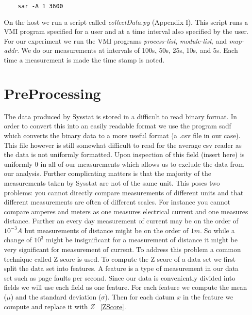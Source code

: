 \begin{center}\label{SAR}
\begin{verbatim}
	sar -A 1 3600
\end{verbatim}
\end{center}

On the host we run a script called \textit{collectData.py} (Appendix I). This script runs a VMI program specified for a user and at a time interval also specified by the user. For our experiment we run the VMI programs \textit{process-list}, \textit{module-list}, and \textit{map-addr}. We do our measurements at intervals of 100s, 50s, 25s, 10s, and 5s. Each time a measurement is made the time stamp is noted.

\section{PreProcessing}

The data produced by Sysstat is stored in a difficult to read binary format. In order to convert this into an easily readable format we use the program sadf~\cite{godard2010sysstat} which converts the binary data to a more useful format (a .csv file in our case). This file however is still somewhat difficult to read for the average csv reader as the data is not uniformly formatted.  Upon inspection of this field (insert here) is uniformly 0 in all of our measurements which allows us to exclude the data from our analysis. Further complicating matters is that the majority of the measurements taken by Sysstat are not of the same unit. This poses two problems: you cannot directly compare measurements of different units and that different measurements are often of different scales. For instance you cannot compare amperes and meters as one measures electrical current and one measures distance. Further an every day measurement of current may be on the order of $10^{-3}A$ but measurements of distance might be on the order of $1m$. So while a change of $10^3$ might be insignificant for a measurement of distance it might be very significant for measurement of current. To address this problem a common technique called Z-score is used. To compute the Z score of a data set we first split the data set into features. A feature is a type of measurement in our data set such as page faults per second. Since our data is conveniently divided into fields we will use each field as one feature. For each feature we compute the mean ($\mu$) and the standard deviation ($\sigma$). Then for each datum $x$ in the feature we compute and replace it with $Z$ ~\ref{ZScore}.


